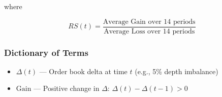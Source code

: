 \documentclass[12pt]{article}
\begin{document}
where

\[
RS(t) = \frac{\text{Average Gain over 14 periods}}{\text{Average Loss over 14 periods}}
\]


\subsubsection*{Dictionary of Terms}

\begin{itemize}
  \item $\Delta(t)$ — Order book delta at time $t$ (e.g., 5\% depth imbalance)
  \item $\text{Gain}$ — Positive change in $\Delta$: $\Delta(t) - \Delta(t-1) > 0$

\end{itemize}
\end{document}
